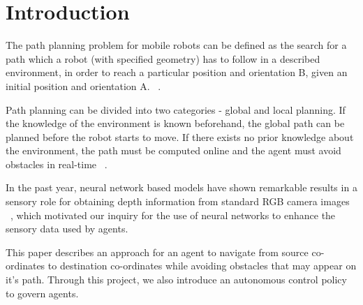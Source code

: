 \section{Introduction}
The path planning problem for mobile robots can be defined as the search for a path which a robot (with specified geometry) has to follow in a described environment, in order to reach a particular position and orientation B, given an initial position and orientation A. ~\cite{Buniyamin_2011_IJSAED}.

Path planning can be divided into two categories - global and local planning. If the knowledge of the environment is known beforehand, the global path can be planned before the robot starts to move. If there exists no prior knowledge about the environment, the path must be computed online and the agent must avoid obstacles in real-time ~\cite{Buniyamin_2010_ICOSSSE}.

In the past year, neural network based models have shown remarkable results in a sensory role for obtaining depth information from standard RGB camera images ~\cite{Liu_2015_CVPR}, which motivated our inquiry for the use of neural networks to enhance the sensory data used by agents.

This paper describes an approach for an agent to navigate from source co-ordinates to destination co-ordinates while avoiding obstacles that may appear on it's path. Through this project, we also introduce an autonomous control policy to govern agents.

